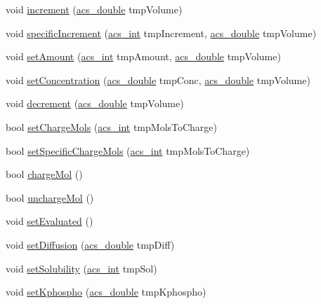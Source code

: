 \begin{DoxyCompactItemize}
\item 
void \hyperlink{a00021_a77f68017e5c50f8943df90efd2e8a0bb}{increment} (\hyperlink{a00050_ab776853a005fcbf56af0424a2a4dd607}{acs\+\_\+double} tmp\+Volume)
\item 
void \hyperlink{a00021_a87e85a2397e5ec34518efa235b529d7e}{specific\+Increment} (\hyperlink{a00050_a8d277355641a098190360234e2ebde35}{acs\+\_\+int} tmp\+Increment, \hyperlink{a00050_ab776853a005fcbf56af0424a2a4dd607}{acs\+\_\+double} tmp\+Volume)
\item 
void \hyperlink{a00021_abefdc30b6f352e5ce5576a610015f5b8}{set\+Amount} (\hyperlink{a00050_a8d277355641a098190360234e2ebde35}{acs\+\_\+int} tmp\+Amount, \hyperlink{a00050_ab776853a005fcbf56af0424a2a4dd607}{acs\+\_\+double} tmp\+Volume)
\item 
void \hyperlink{a00021_a018a8f55746849f4814b4d281d4aca5a}{set\+Concentration} (\hyperlink{a00050_ab776853a005fcbf56af0424a2a4dd607}{acs\+\_\+double} tmp\+Conc, \hyperlink{a00050_ab776853a005fcbf56af0424a2a4dd607}{acs\+\_\+double} tmp\+Volume)
\item 
void \hyperlink{a00021_ae5142c6ab199459bc1d7d5945c761f0e}{decrement} (\hyperlink{a00050_ab776853a005fcbf56af0424a2a4dd607}{acs\+\_\+double} tmp\+Volume)
\item 
bool \hyperlink{a00021_a27f9852312659597efe7925124152286}{set\+Charge\+Mols} (\hyperlink{a00050_a8d277355641a098190360234e2ebde35}{acs\+\_\+int} tmp\+Mols\+To\+Charge)
\item 
bool \hyperlink{a00021_a088763fc6b6279040920d219f314c90e}{set\+Specific\+Charge\+Mols} (\hyperlink{a00050_a8d277355641a098190360234e2ebde35}{acs\+\_\+int} tmp\+Mols\+To\+Charge)
\item 
bool \hyperlink{a00021_adc36fb991695aed6503b8ed82e06bca5}{charge\+Mol} ()
\item 
bool \hyperlink{a00021_acf8588148932adb86229eec28f7cde7c}{uncharge\+Mol} ()
\item 
void \hyperlink{a00021_a089da38f8016bd588fa262cd836d1c4d}{set\+Evaluated} ()
\item 
void \hyperlink{a00021_ab4b4adbc3c26e3a8c81a090c9d1330e3}{set\+Diffusion} (\hyperlink{a00050_ab776853a005fcbf56af0424a2a4dd607}{acs\+\_\+double} tmp\+Diff)
\item 
void \hyperlink{a00021_a27c2d0448e1f56e0962132d8d360fc07}{set\+Solubility} (\hyperlink{a00050_a8d277355641a098190360234e2ebde35}{acs\+\_\+int} tmp\+Sol)
\item 
void \hyperlink{a00021_a4d33fdb252e1884841f9c671ce25973c}{set\+Kphospho} (\hyperlink{a00050_ab776853a005fcbf56af0424a2a4dd607}{acs\+\_\+double} tmp\+Kphospho)

\end{DoxyCompactItemize}
